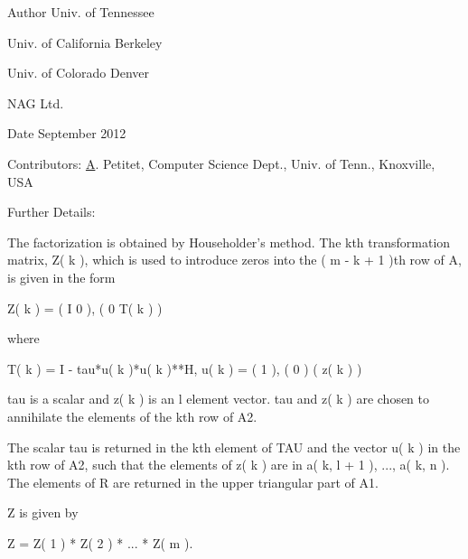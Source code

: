 \begin{DoxyAuthor}{Author}
Univ. of Tennessee 

Univ. of California Berkeley 

Univ. of Colorado Denver 

N\+A\+G Ltd. 
\end{DoxyAuthor}
\begin{DoxyDate}{Date}
September 2012 
\end{DoxyDate}
\begin{DoxyParagraph}{Contributors\+: }
\hyperlink{classA}{A}. Petitet, Computer Science Dept., Univ. of Tenn., Knoxville, U\+S\+A 
\end{DoxyParagraph}
\begin{DoxyParagraph}{Further Details\+: }
\begin{DoxyVerb}  The factorization is obtained by Householder's method.  The kth
  transformation matrix, Z( k ), which is used to introduce zeros into
  the ( m - k + 1 )th row of A, is given in the form

     Z( k ) = ( I     0   ),
              ( 0  T( k ) )

  where

     T( k ) = I - tau*u( k )*u( k )**H,   u( k ) = (   1    ),
                                                 (   0    )
                                                 ( z( k ) )

  tau is a scalar and z( k ) is an l element vector. tau and z( k )
  are chosen to annihilate the elements of the kth row of A2.

  The scalar tau is returned in the kth element of TAU and the vector
  u( k ) in the kth row of A2, such that the elements of z( k ) are
  in  a( k, l + 1 ), ..., a( k, n ). The elements of R are returned in
  the upper triangular part of A1.

  Z is given by

     Z =  Z( 1 ) * Z( 2 ) * ... * Z( m ).\end{DoxyVerb}
 
\end{DoxyParagraph}
